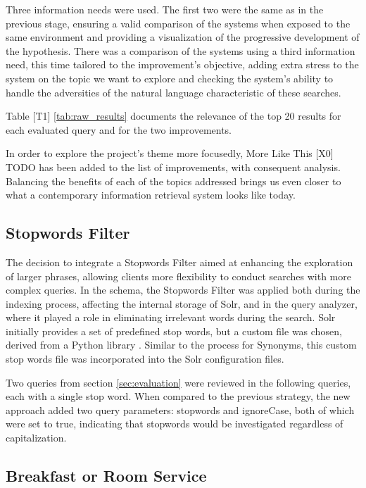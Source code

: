\documentclass[sigconf]{acmart}
\begin{document}
Three information needs were used. The first two were the same as in the previous stage, ensuring a valid comparison of the systems when exposed to the same environment and providing a visualization of the progressive development of the hypothesis. There was a comparison of the systems using a third information need, this time tailored to the improvement's objective, adding extra stress to the system on the topic we want to explore and checking the system's ability to handle the adversities of the natural language characteristic of these searches.

Table [T1] \ref{tab:raw_results} documents the relevance of the top 20 results for each evaluated query and for the two improvements.

In order to explore the project's theme more focusedly, More Like This [X0] TODO has been added to the list of improvements, with consequent analysis. Balancing the benefits of each of the topics addressed brings us even closer to what a contemporary information retrieval system looks like today.

\subsection{Stopwords Filter}

The decision to integrate a Stopwords Filter aimed at enhancing the exploration of larger phrases, allowing clients more flexibility to conduct searches with more complex queries. In the schema, the Stopwords Filter was applied both during the indexing process, affecting the internal storage of Solr, and in the query analyzer, where it played a role in eliminating irrelevant words during the search.
Solr initially provides a set of predefined stop words, but a custom file was chosen, derived from a Python library \cite{NLTK}. Similar to the process for Synonyms, this custom stop words file was incorporated into the Solr configuration files.

Two queries from section \ref{sec:evaluation} were reviewed in the following queries, each with a single stop word. When compared to the previous strategy, the new approach added two query parameters: stopwords and ignoreCase, both of which were set to true, indicating that stopwords would be investigated regardless of capitalization.

\renewcommand{\thesubsection}{\Alph{subsection}}

\setcounter{subsection}{0}
\subsection{Breakfast or Room Service}
\end{document}
